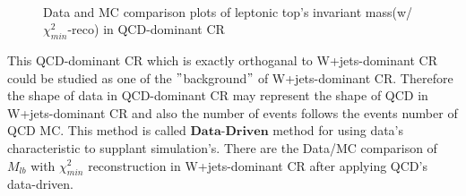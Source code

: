 		\begin{figure}[H]
		\centering
			\\
		\caption{Data and MC comparison plots of leptonic top's invariant mass(w/ $\chi^2_{min}$-reco) in QCD-dominant CR}
		\label{EventSelReco:fig:chi2_CR2_1C_Mlb}
		\end{figure}
		\FloatBarrier

		This QCD-dominant CR which is exactly orthoganal to W+jets-dominant CR could be studied as one of the $"$background$"$ of W+jets-dominant CR. Therefore the shape of data in QCD-dominant CR may represent the shape of QCD in W+jets-dominant CR and also the number of events follows the events number of QCD MC. This method is called $\textbf{Data-Driven}$ method for using data's characteristic to supplant simulation's. There are the Data/MC comparison of $M_{lb}$ with $\chi^2_{min}$ reconstruction in W+jets-dominant CR after applying QCD's data-driven.

